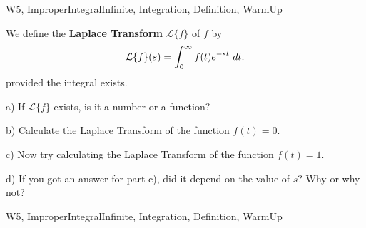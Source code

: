 \begin{tagblock}{W5, ImproperIntegralInfinite, Integration, Definition, WarmUp}
\begin{question}
	
We define the \textbf{Laplace Transform} $\mathcal{L}\{ f\}$ of $f$ by 
\[
\mathcal{L}\{ f\}(s)=\int_0^{\infty} f(t)e^{-st} \ dt.
\]
provided the integral exists. 

\bigskip

a) If $\mathcal{L}\{ f\}$ exists, is it a number or a function?

\bigskip

b) Calculate the Laplace Transform of the function $f(t)=0$. 
 
\bigskip

c) Now try calculating the Laplace Transform of the function $f(t)=1$. 

\bigskip

d) If you got an answer for part c), did it depend on the value of $s$? Why or why not?  

    
\begin{tags}
        W5, ImproperIntegralInfinite, Integration, Definition, WarmUp
\end{tags}
    
\begin{diary}
        
\end{diary}
	
\begin{solution}

\end{solution}
	
\end{question}

\end{tagblock}

